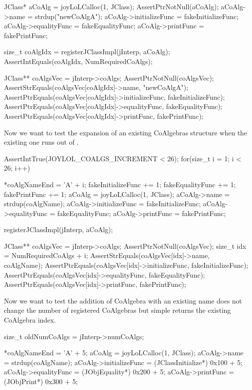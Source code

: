   JClass* aCoAlg   = joyLoLCalloc(1, JClass);
  AssertPtrNotNull(aCoAlg);
  aCoAlg->name           = strdup("newCoAlgA");
  aCoAlg->initializeFunc = fakeInitializeFunc;
  aCoAlg->equalityFunc   = fakeEqualityFunc;
  aCoAlg->printFunc      = fakePrintFunc;

  size_t coAlgIdx = registerJClassImpl(jInterp, aCoAlg);
  AssertIntEquals(coAlgIdx, NumRequiredCoAlgs);

  JClass** coAlgsVec = jInterp->coAlgs;
  AssertPtrNotNull(coAlgsVec);
  AssertStrEquals(coAlgsVec[coAlgIdx]->name, "newCoAlgA");
  AssertPtrEquals(coAlgsVec[coAlgIdx]->initializeFunc, fakeInitializeFunc);
  AssertPtrEquals(coAlgsVec[coAlgIdx]->equalityFunc, fakeEqualityFunc);
  AssertPtrEquals(coAlgsVec[coAlgIdx]->printFunc,    fakePrintFunc);
\stopCTest

Now we want to test the expansion of an existing CoAlgebras structure when 
the existing one runs out of . 

\startCTest
  AssertIntTrue(JOYLOL_COALGS_INCREMENT < 26);
  for(size_t i = 1; i < 26; i++) {
    *coAlgNameEnd          = 'A' + i;
    fakeInitializeFunc    += 1;
    fakeEqualityFunc      += 1;
    fakePrintFunc         += 1;
    aCoAlg                 = joyLoLCalloc(1, JClass);
    aCoAlg->name           = strdup(coAlgName);
    aCoAlg->initializeFunc = fakeInitializeFunc;
    aCoAlg->equalityFunc   = fakeEqualityFunc;
    aCoAlg->printFunc      = fakePrintFunc;

    registerJClassImpl(jInterp, aCoAlg);

    JClass** coAlgsVec = jInterp->coAlgs;
    AssertPtrNotNull(coAlgsVec);
    size_t idx = NumRequiredCoAlgs + i;
    AssertStrEquals(coAlgsVec[idx]->name, coAlgName);
    AssertPtrEquals(coAlgsVec[idx]->initializeFunc, fakeInitializeFunc);
    AssertPtrEquals(coAlgsVec[idx]->equalityFunc, fakeEqualityFunc);
    AssertPtrEquals(coAlgsVec[idx]->printFunc,    fakePrintFunc);
  }
\stopCTest

Now we want to test the addition of CoAlgebra with an existing name does 
not change the number of registered CoAlgebras but simple returns the 
existing CoAlgebra index. 

\startCTest
  size_t oldNumCoAlgs  = jInterp->numCoAlgs;

  *coAlgNameEnd          = 'A' + 5;
  aCoAlg                 = joyLoLCalloc(1, JClass);
  aCoAlg->name           = strdup(coAlgName);
  aCoAlg->initializeFunc = (JClassInitialize*) 0x100 + 5;
  aCoAlg->equalityFunc   = (JObjEquality*)     0x200 + 5;
  aCoAlg->printFunc      = (JObjPrint*)        0x300 + 5;
  
